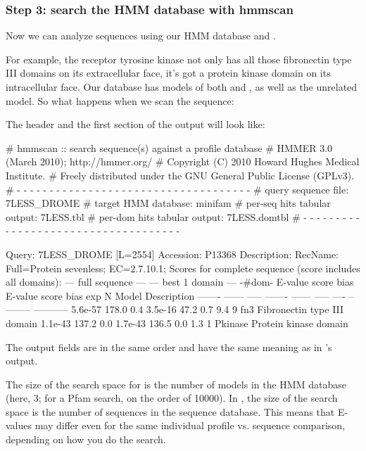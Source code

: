 \subsubsection{Step 3: search the HMM database with hmmscan}

Now we can analyze sequences using our HMM database and
. 

For example, the receptor tyrosine kinase  not only
has all those fibronectin type III domains on its extracellular face,
it's got a protein kinase domain on its intracellular face. Our
 database has models of both  and
, as well as the unrelated  model. So
what happens when we scan the  sequence:


The header and the first section of the output will look like:

\begin{sreoutput}
# hmmscan :: search sequence(s) against a profile database
# HMMER 3.0 (March 2010); http://hmmer.org/
# Copyright (C) 2010 Howard Hughes Medical Institute.
# Freely distributed under the GNU General Public License (GPLv3).
# - - - - - - - - - - - - - - - - - - - - - - - - - - - - - - - - - - - -
# query sequence file:             7LESS_DROME
# target HMM database:             minifam
# per-seq hits tabular output:     7LESS.tbl
# per-dom hits tabular output:     7LESS.domtbl
# - - - - - - - - - - - - - - - - - - - - - - - - - - - - - - - - - - - -

Query:       7LESS_DROME  [L=2554]
Accession:   P13368
Description: RecName: Full=Protein sevenless;          EC=2.7.10.1;
Scores for complete sequence (score includes all domains):
   --- full sequence ---   --- best 1 domain ---    -#dom-
    E-value  score  bias    E-value  score  bias    exp  N  Model    Description
    ------- ------ -----    ------- ------ -----   ---- --  -------- -----------
    5.6e-57  178.0   0.4    3.5e-16   47.2   0.7    9.4  9  fn3      Fibronectin type III domain
    1.1e-43  137.2   0.0    1.7e-43  136.5   0.0    1.3  1  Pkinase  Protein kinase domain
\end{sreoutput}

The output fields are in the same order and have the same meaning as
in 's output. 

The size of the search space for  is the number of
models in the HMM database (here, 3; for a Pfam search, on the order
of 10000). In , the size of the search space is the
number of sequences in the sequence database. This means that E-values
may differ even for the same individual profile vs. sequence
comparison, depending on how you do the search.


